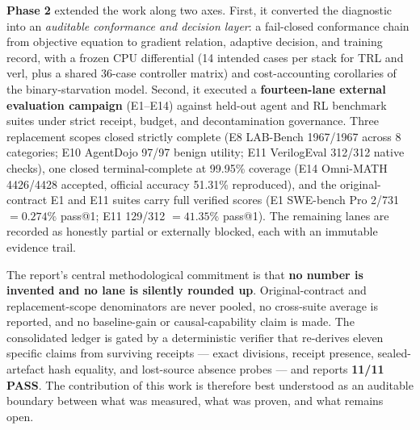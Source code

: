\documentclass[12pt,a4paper]{report}
\begin{document}
\textbf{Phase 2} extended the work along two axes. First, it converted the
diagnostic into an \emph{auditable conformance and decision layer}: a fail-closed
conformance chain from objective equation to gradient relation, adaptive decision,
and training record, with a frozen CPU differential (14 intended cases per stack
for TRL and verl, plus a shared 36-case controller matrix) and cost-accounting
corollaries of the binary-starvation model. Second, it executed a
\textbf{fourteen-lane external evaluation campaign} (E1--E14) against held-out
agent and RL benchmark suites under strict receipt, budget, and decontamination
governance. Three replacement scopes closed strictly complete (E8 LAB-Bench
1967/1967 across 8 categories; E10 AgentDojo 97/97 benign utility; E11
VerilogEval 312/312 native checks), one closed terminal-complete at 99.95\%
coverage (E14 Omni-MATH 4426/4428 accepted, official accuracy 51.31\%
reproduced), and the original-contract E1 and E11 suites carry full verified
scores (E1 SWE-bench Pro 2/731 $=0.274\%$ pass@1; E11 129/312 $=41.35\%$
pass@1). The remaining lanes are recorded as honestly partial or externally
blocked, each with an immutable evidence trail.

The report's central methodological commitment is that \textbf{no number is
invented and no lane is silently rounded up}. Original-contract and
replacement-scope denominators are never pooled, no cross-suite average is
reported, and no baseline-gain or causal-capability claim is made. The
consolidated ledger is gated by a deterministic verifier that re-derives eleven
specific claims from surviving receipts --- exact divisions, receipt presence,
sealed-artefact hash equality, and lost-source absence probes --- and reports
\textbf{11/11 PASS}. The contribution of this work is therefore best understood
as an auditable boundary between what was measured, what was proven, and what
remains open.

\clearpage
\tableofcontents
\clearpage
\listoffigures
\clearpage
\listoftables

\clearpage
{}
\setcounter{page}{1}














\end{document}
